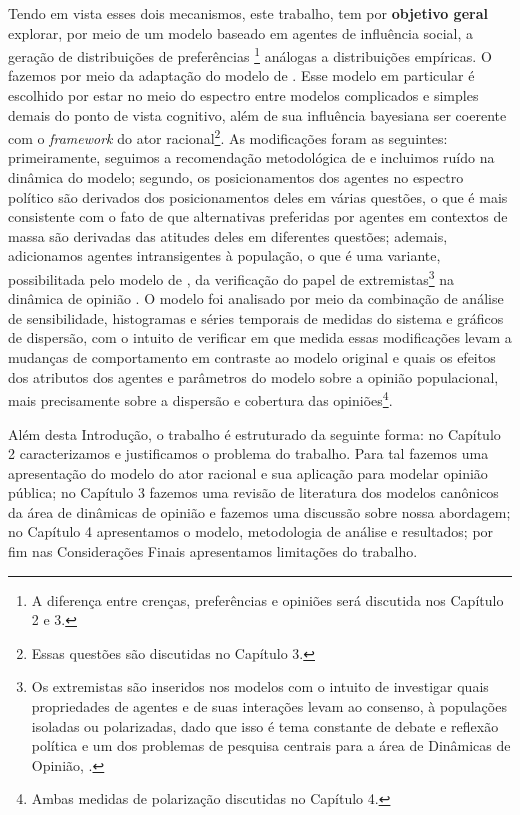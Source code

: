 Tendo em vista esses dois mecanismos, este trabalho, tem por \textbf{objetivo
  geral} explorar, por meio de um modelo baseado em agentes de influência
social, a geração de distribuições de preferências \footnote{A diferença entre
  crenças, preferências e opiniões será discutida nos Capítulo 2 e 3.} análogas
a distribuições empíricas. O fazemos por meio da adaptação do modelo de
. Esse modelo em particular é escolhido por
estar no meio do espectro entre modelos complicados e simples demais do ponto de
vista cognitivo, além de sua influência bayesiana ser coerente com o
\textit{framework} do ator racional\footnote{Essas questões são discutidas no
  Capítulo 3.}. As modificações foram as seguintes: primeiramente, seguimos a
recomendação metodológica de  e incluimos ruído na
dinâmica do modelo; segundo, os posicionamentos dos agentes no espectro político
são derivados dos posicionamentos deles em várias questões, o que é mais
consistente com o fato de que alternativas preferidas por agentes em contextos
de massa são derivadas das atitudes deles em diferentes questões; ademais,
adicionamos agentes intransigentes à população, o que é uma variante,
possibilitada pelo modelo de , da verificação do
papel de extremistas\footnote{ Os extremistas são inseridos nos modelos com o
  intuito de investigar quais propriedades de agentes e de suas interações levam
  ao consenso, à populações isoladas ou polarizadas, dado que isso é tema
  constante de debate e reflexão política e um dos problemas de pesquisa
  centrais para a área de Dinâmicas de Opinião, \cite{fiorina2005culture,
    pulick2016, bramson2016disambiguation}.} na dinâmica de opinião
\cite{deffuant2002can, flache2017}. O modelo foi analisado por meio da
combinação de análise de sensibilidade, histogramas e séries temporais de
medidas do sistema e gráficos de dispersão, com o intuito de verificar em que
medida essas modificações levam a mudanças de comportamento em contraste ao
modelo original e quais os efeitos dos atributos dos agentes e parâmetros do
modelo sobre a opinião populacional, mais precisamente sobre a dispersão e
cobertura das opiniões\footnote{Ambas medidas de
  polarização discutidas no Capítulo 4.}.

Além desta Introdução, o trabalho é estruturado da seguinte forma: no Capítulo 2
caracterizamos e justificamos o problema do trabalho. Para tal fazemos uma
apresentação do modelo do ator racional e sua aplicação para modelar opinião
pública; no Capítulo 3 fazemos uma revisão de literatura dos modelos canônicos
da área de dinâmicas de opinião e fazemos uma discussão sobre nossa abordagem;
no Capítulo 4 apresentamos o modelo, metodologia de análise e resultados;  por
fim nas Considerações Finais apresentamos limitações do trabalho.








